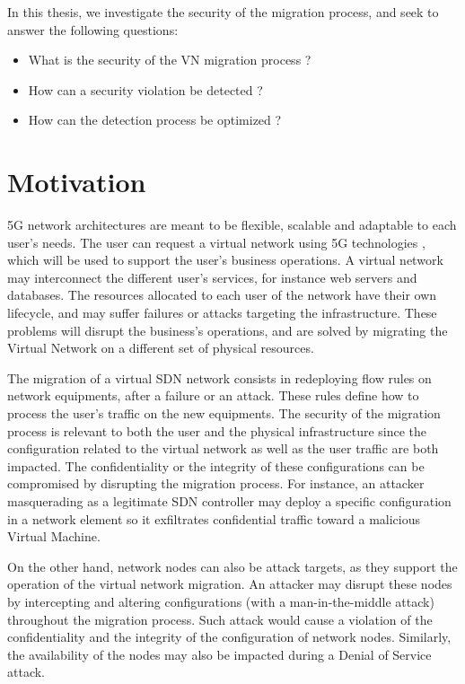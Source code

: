In this thesis, we investigate the security of the migration process, and seek to answer the following questions:

\begin{itemize}
    \item What is the security of the VN migration process ?
    \item How can a security violation be detected ?
    \item How can the detection process be optimized ?
\end{itemize}

\section{Motivation}
5G network architectures are meant to be flexible, scalable and adaptable to each user's needs.
The user can request a virtual network using 5G technologies , which will be used to support the user's business operations. A virtual network may interconnect the different user's services, for instance web servers and databases. 
The resources allocated to each user of the network have their own lifecycle, and may suffer failures or attacks targeting the infrastructure. These problems will disrupt the business's operations, and are solved by migrating the Virtual Network on a different set of physical resources.

The migration of a virtual SDN network consists in redeploying flow rules on network equipments, after a failure or an attack. These rules define how to process the user's traffic on the new equipments.
The security of the migration process is relevant to both the user and the physical infrastructure since the configuration related to the virtual network as well as the user traffic are both impacted. 
The confidentiality or the integrity of these configurations can be compromised by disrupting the migration process. For instance,  an attacker masquerading as a legitimate SDN controller may deploy a specific configuration in a network element so it exfiltrates confidential traffic toward a malicious Virtual Machine.

On the other hand, network nodes can also be attack targets, as they support the operation of the virtual network migration.
An attacker may disrupt these nodes by intercepting and altering configurations (\eg with a man-in-the-middle attack) throughout the migration process.
Such attack would cause a violation of the confidentiality and the integrity of the configuration of network nodes. Similarly, the availability of the nodes may also be impacted during a Denial of Service attack.

